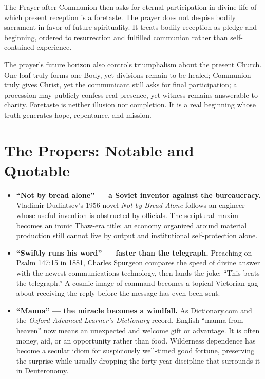 The Prayer after Communion then asks for eternal participation in divine life of which present reception is a foretaste. The prayer does not despise bodily sacrament in favor of future spirituality. It treats bodily reception as pledge and beginning, ordered to resurrection and fulfilled communion rather than self-contained experience.

The prayer's future horizon also controls triumphalism about the present Church. One loaf truly forms one Body, yet divisions remain to be healed; Communion truly gives Christ, yet the communicant still asks for final participation; a procession may publicly confess real presence, yet witness remains answerable to charity. Foretaste is neither illusion nor completion. It is a real beginning whose truth generates hope, repentance, and mission.

\section*{The Propers: Notable and Quotable}

{\small
\begin{itemize}[itemsep=0em,topsep=0.15em,parsep=0pt]
\item \textbf{“Not by bread alone” --- a Soviet inventor against the bureaucracy.\enspace{}} Vladimir Dudintsev's 1956 novel \emph{Not by Bread Alone} follows an engineer whose useful invention is obstructed by officials. The scriptural maxim becomes an ironic Thaw-era title: an economy organized around material production still cannot live by output and institutional self-protection alone.

\item \textbf{“Swiftly runs his word” --- faster than the telegraph.\enspace{}} Preaching on Psalm 147:15 in 1881, Charles Spurgeon compares the speed of divine answer with the newest communications technology, then lands the joke: “This beats the telegraph.” A cosmic image of command becomes a topical Victorian gag about receiving the reply before the message has even been sent.

\item \textbf{“Manna” --- the miracle becomes a windfall.\enspace{}} As Dictionary.com and the \emph{Oxford Advanced Learner's Dictionary} record, English “manna from heaven” now means an unexpected and welcome gift or advantage. It is often money, aid, or an opportunity rather than food. Wilderness dependence has become a secular idiom for suspiciously well-timed good fortune, preserving the surprise while usually dropping the forty-year discipline that surrounds it in Deuteronomy.
\end{itemize}
}

